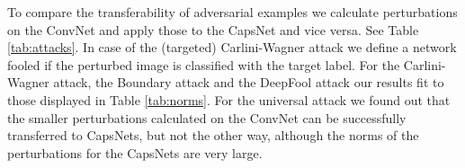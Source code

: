 \documentclass{article}
\begin{document}
To compare the transferability of adversarial examples we calculate perturbations on the ConvNet and apply those to the CapsNet and vice versa. See Table \ref{tab:attacks}. In case of the (targeted) Carlini-Wagner attack we define a network fooled if the perturbed image is classified with the target label. For the Carlini-Wagner attack, the Boundary attack and the DeepFool attack our results fit to those displayed in Table \ref{tab:norms}. For the universal attack we found out that the smaller perturbations calculated on the ConvNet can be successfully transferred to CapsNets, but not the other way, although the norms of the perturbations for the CapsNets are very large.

\begin{table}[h]
	\caption{Test accuracies achieved by our networks.}
	\vskip 0.15in
	\centering{}
	\label{tab:accuracies}
\end{table}
\end{document}
